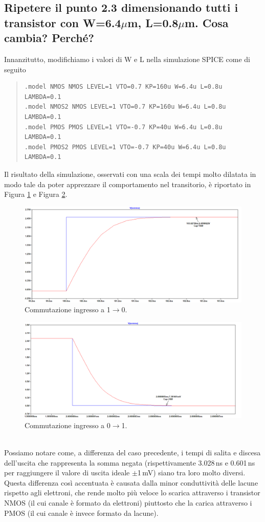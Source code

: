 \documentclass[a4paper,10pt]{article}
\begin{document}
\subsection{Ripetere il punto 2.3 dimensionando tutti i transistor con W=6.4$\mu$m, L=0.8$\mu$m. Cosa cambia? Perché?}
Innanzitutto, modifichiamo i valori di W e L nella simulazione SPICE come di seguito
\begin{quote}
\begin{verbatim}
.model NMOS NMOS LEVEL=1 VTO=0.7 KP=160u W=6.4u L=0.8u LAMBDA=0.1
.model NMOS2 NMOS LEVEL=1 VTO=0.7 KP=160u W=6.4u L=0.8u LAMBDA=0.1
.model PMOS PMOS LEVEL=1 VTO=-0.7 KP=40u W=6.4u L=0.8u LAMBDA=0.1
.model PMOS2 PMOS LEVEL=1 VTO=-0.7 KP=40u W=6.4u L=0.8u LAMBDA=0.1
\end{verbatim}
\end{quote}
Il risultato della simulazione, osservati con una scala dei tempi molto dilatata in modo tale da poter apprezzare il comportamento nel transitorio, è riportato in Figura \ref{fig:carica41} e Figura \ref{fig:scarica42}.\\
\begin{figure}[h!]
  	\centering
 	\includegraphics[width=0.9\linewidth]{es2-4-carica.png}
  	\caption{Commutazione ingresso a 1$\rightarrow$0.}
  	\label{fig:carica41}
\end{figure}
\begin{figure}[h!]
  	\centering
 	\includegraphics[width=0.9\linewidth]{es2-4-scarica.png}
  	\caption{Commutazione ingresso a 0$\rightarrow$1.}
  	\label{fig:scarica42}
\end{figure}\\

Possiamo notare come, a differenza del caso precedente, i tempi di salita e discesa dell'uscita che rappresenta la somma negata (rispettivamente 3.028$\,$ns e 0.601$\,$ns per raggiungere il valore di uscita ideale $\pm$1$\,$mV) siano tra loro molto diversi. Questa differenza così accentuata è causata dalla minor conduttività delle lacune rispetto agli elettroni, che rende molto più veloce lo scarica attraverso i transistor NMOS (il cui canale è formato da elettroni) piuttosto che la carica attraverso i PMOS (il cui canale è invece formato da lacune).
\end{document}
